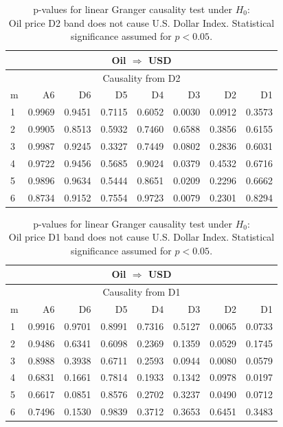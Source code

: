 %
%
\begin{table}[H]
\begin{center}
\begin{tabular}{l|r r r r r r r}
\hline\hline
\multicolumn{8}{c}{Oil $\Rightarrow$ USD}\\
\hline
\multicolumn{8}{c}{Causality from D2}\\
\hline\hline
m & A6 & D6 & D5 & D4 & D3 & D2 & D1 \\
\hline
1 & 0.9969 & 0.9451 & 0.7115 & 0.6052 & \cellcolor{mygrey}0.0030 & 0.0912 & 0.3573 \\
2 & 0.9905 & 0.8513 & 0.5932 & 0.7460 & 0.6588 & 0.3856 & 0.6155 \\
3 & 0.9987 & 0.9245 & 0.3327 & 0.7449 & 0.0802 & 0.2836 & 0.6031 \\
4 & 0.9722 & 0.9456 & 0.5685 & 0.9024 & \cellcolor{mygrey}0.0379 & 0.4532 & 0.6716 \\
5 & 0.9896 & 0.9634 & 0.5444 & 0.8651 & \cellcolor{mygreen}0.0209 & 0.2296 & 0.6662 \\
6 & 0.8734 & 0.9152 & 0.7554 & 0.9723 & \cellcolor{mygrey}0.0079 & 0.2301 & 0.8294 \\
\hline\hline
\end{tabular}
\caption{p-values for linear Granger causality test under $H_0$:\\
Oil price D2 band does not cause U.S. Dollar Index. Statistical significance assumed for $p<0.05$.}
\end{center}
\end{table}

%
%
\begin{table}[H]
\begin{center}
\begin{tabular}{l|r r r r r r r}
\hline\hline
\multicolumn{8}{c}{Oil $\Rightarrow$ USD}\\
\hline
\multicolumn{8}{c}{Causality from D1}\\
\hline\hline
m & A6 & D6 & D5 & D4 & D3 & D2 & D1 \\
\hline
1 & 0.9916 & 0.9701 & 0.8991 & 0.7316 & 0.5127 & \cellcolor{mygreen}0.0065 & 0.0733 \\
2 & 0.9486 & 0.6341 & 0.6098 & 0.2369 & 0.1359 & 0.0529 & 0.1745 \\
3 & 0.8988 & 0.3938 & 0.6711 & 0.2593 & 0.0944 & \cellcolor{mygrey}0.0080 & 0.0579 \\
4 & 0.6831 & 0.1661 & 0.7814 & 0.1933 & 0.1342 & 0.0978 & \cellcolor{mygrey}0.0197 \\
5 & 0.6617 & 0.0851 & 0.8576 & 0.2702 & 0.3237 & \cellcolor{mygrey}0.0490 & 0.0712 \\
6 & 0.7496 & 0.1530 & 0.9839 & 0.3712 & 0.3653 & 0.6451 & 0.3483 \\
\hline\hline
\end{tabular}
\caption{p-values for linear Granger causality test under $H_0$:\\
Oil price D1 band does not cause U.S. Dollar Index. Statistical significance assumed for $p<0.05$.}
\end{center}
\end{table}

